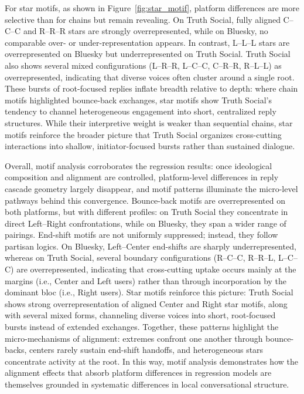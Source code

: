 \documentclass[letterpaper]{article} %
\begin{document}
For star motifs, as shown in Figure~\ref{fig:star_motif}, platform differences are more selective than for chains but remain revealing. On Truth Social, fully aligned C–C–C and R–R–R stars are strongly overrepresented, while on Bluesky, no comparable over- or under-representation appears. In contrast, L–L–L stars are overrepresented on Bluesky but underrepresented on Truth Social. Truth Social also shows several mixed configurations (L–R–R, L–C–C, C–R–R, R–L–L) as overrepresented, indicating that diverse voices often cluster around a single root. These bursts of root-focused replies inflate breadth relative to depth: where chain motifs highlighted bounce-back exchanges, star motifs show Truth Social’s tendency to channel heterogeneous engagement into short, centralized reply structures. While their interpretive weight is weaker than sequential chains, star motifs reinforce the broader picture that Truth Social organizes cross-cutting interactions into shallow, initiator-focused bursts rather than sustained dialogue.

Overall, motif analysis corroborates the regression results: once ideological composition and alignment are controlled, platform-level differences in reply cascade geometry largely disappear, and motif patterns illuminate the micro-level pathways behind this convergence. Bounce-back motifs are overrepresented on both platforms, but with different profiles: on Truth Social they concentrate in direct Left–Right confrontations, while on Bluesky, they span a wider range of pairings. End-shift motifs are not uniformly suppressed; instead, they follow partisan logics. On Bluesky, Left–Center end-shifts are sharply underrepresented, whereas on Truth Social, several boundary configurations (R–C–C, R–R–L, L–C–C) are overrepresented, indicating that cross-cutting uptake occurs mainly at the margins (i.e., Center and Left users) rather than through incorporation by the dominant bloc (i.e., Right users). Star motifs reinforce this picture: Truth Social shows strong overrepresentation of aligned Center and Right star motifs, along with several mixed forms, channeling diverse voices into short, root-focused bursts instead of extended exchanges. Together, these patterns highlight the micro-mechanisms of alignment: extremes confront one another through bounce-backs, centers rarely sustain end-shift handoffs, and heterogeneous stars concentrate activity at the root. In this way, motif analysis demonstrates how the alignment effects that absorb platform differences in regression models are themselves grounded in systematic differences in local conversational structure.
\end{document}
